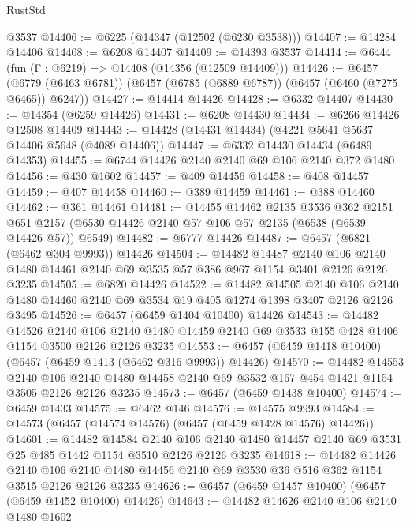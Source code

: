 \begin{lexlean}{RustStd}
\begin{coremodule}
    @3537
@14406 := @6225 (@14347 (@12502 (@6230 @3538)))
@14407 := @14284 @14406
@14408 := @6208 @14407
@14409 := @14393 @3537
@14414 := @6444 (fun (Γ : @6219) => @14408 (@14356 (@12509 @14409)))
@14426 := @6457
    (@6779 (@6463 @6781))
    (@6457 (@6785 (@6889 @6787)) (@6457 (@6460 (@7275 @6465)) @6247))
@14427 := @14414 @14426
@14428 := @6332 @14407
@14430 := @14354 (@6259 @14426)
@14431 := @6208 @14430
@14434 := @6266 @14426 @12508 @14409
@14443 := @14428 (@14431 @14434) (@4221 @5641 @5637 @14406 @5648 (@4089 @14406))
@14447 := @6332 @14430 @14434 (@6489 @14353)
@14455 := @6744 @14426 @2140 @2140 @69 @106 @2140 @372 @1480
@14456 := @430 @1602
@14457 := @409 @14456
@14458 := @408 @14457
@14459 := @407 @14458
@14460 := @389 @14459
@14461 := @388 @14460
@14462 := @361 @14461
@14481 := @14455
    @14462
    @2135
    @3536
    @362
    @2151
    @651
    @2157
    (@6530 @14426 @2140 @57 @106 @57 @2135 (@6538 (@6539 @14426 @57)) @6549)
@14482 := @6777 @14426
@14487 := @6457 (@6821 (@6462 @304 @9993)) @14426
@14504 := @14482
    @14487
    @2140
    @106
    @2140
    @1480
    @14461
    @2140
    @69
    @3535
    @57
    @386
    @967
    @1154
    @3401
    @2126
    @2126
    @3235
@14505 := @6820 @14426
@14522 := @14482
    @14505
    @2140
    @106
    @2140
    @1480
    @14460
    @2140
    @69
    @3534
    @19
    @405
    @1274
    @1398
    @3407
    @2126
    @2126
    @3495
@14526 := @6457 (@6459 @1404 @10400) @14426
@14543 := @14482
    @14526
    @2140
    @106
    @2140
    @1480
    @14459
    @2140
    @69
    @3533
    @155
    @428
    @1406
    @1154
    @3500
    @2126
    @2126
    @3235
@14553 := @6457 (@6459 @1418 @10400) (@6457 (@6459 @1413 (@6462 @316 @9993)) @14426)
@14570 := @14482
    @14553
    @2140
    @106
    @2140
    @1480
    @14458
    @2140
    @69
    @3532
    @167
    @454
    @1421
    @1154
    @3505
    @2126
    @2126
    @3235
@14573 := @6457 (@6459 @1438 @10400)
@14574 := @6459 @1433
@14575 := @6462 @146
@14576 := @14575 @9993
@14584 := @14573 (@6457 (@14574 @14576) (@6457 (@6459 @1428 @14576) @14426))
@14601 := @14482
    @14584
    @2140
    @106
    @2140
    @1480
    @14457
    @2140
    @69
    @3531
    @25
    @485
    @1442
    @1154
    @3510
    @2126
    @2126
    @3235
@14618 := @14482
    @14426
    @2140
    @106
    @2140
    @1480
    @14456
    @2140
    @69
    @3530
    @36
    @516
    @362
    @1154
    @3515
    @2126
    @2126
    @3235
@14626 := @6457 (@6459 @1457 @10400) (@6457 (@6459 @1452 @10400) @14426)
@14643 := @14482
    @14626
    @2140
    @106
    @2140
    @1480
    @1602

\end{coremodule}
\end{lexlean}
